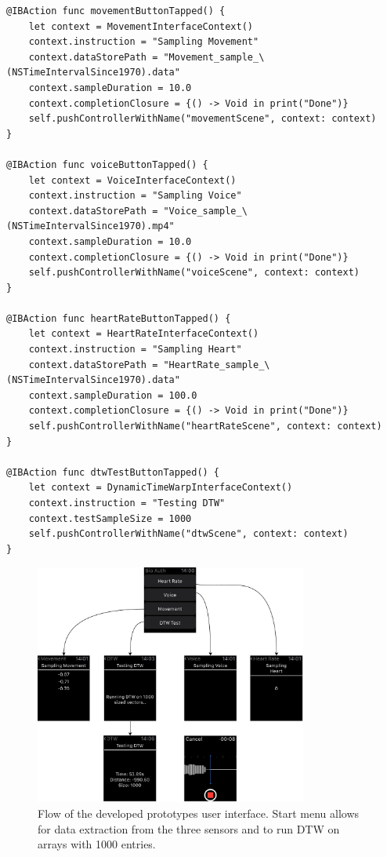 \begin{lstlisting}[label={lst:ui}, caption={Spawning of ViewControllers from the
main interface, passing contexts setting up the sampling.},basicstyle=\small]
@IBAction func movementButtonTapped() {
    let context = MovementInterfaceContext()
    context.instruction = "Sampling Movement"
    context.dataStorePath = "Movement_sample_\(NSTimeIntervalSince1970).data"
    context.sampleDuration = 10.0
    context.completionClosure = {() -> Void in print("Done")}
    self.pushControllerWithName("movementScene", context: context)
}

@IBAction func voiceButtonTapped() {
    let context = VoiceInterfaceContext()
    context.instruction = "Sampling Voice"
    context.dataStorePath = "Voice_sample_\(NSTimeIntervalSince1970).mp4"
    context.sampleDuration = 10.0
    context.completionClosure = {() -> Void in print("Done")}
    self.pushControllerWithName("voiceScene", context: context)
}

@IBAction func heartRateButtonTapped() {
    let context = HeartRateInterfaceContext()
    context.instruction = "Sampling Heart"
    context.dataStorePath = "HeartRate_sample_\(NSTimeIntervalSince1970).data"
    context.sampleDuration = 100.0
    context.completionClosure = {() -> Void in print("Done")}
    self.pushControllerWithName("heartRateScene", context: context)
}

@IBAction func dtwTestButtonTapped() {
    let context = DynamicTimeWarpInterfaceContext()
    context.instruction = "Testing DTW"
    context.testSampleSize = 1000
    self.pushControllerWithName("dtwScene", context: context)
}
\end{lstlisting}


\begin{figure}[!h]
\centering
\includegraphics[width=0.8\textwidth]{../media/bioswp_ui.pdf}
\caption{Flow of the developed prototypes user interface. Start menu allows for
data extraction from the three sensors and to run DTW on arrays with 1000
    entries.}
\label{fig:ui}
\end{figure}

